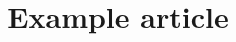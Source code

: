 \documentclass[11pt]{article}
\title{Example article}
\begin{document}
\scriptsize
\nocite{*}



\end{document}
